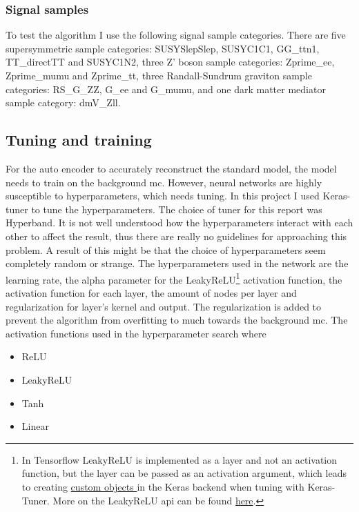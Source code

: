 \documentclass[ reprint, amsmath,amssymb, aps, nofootinbib]{revtex4-2}
\begin{document}
\subsubsection{Signal samples}
To test the algorithm I use the following signal sample categories. There are five supersymmetric sample categories: SUSYSlepSlep, SUSYC1C1, GG\_ttn1, TT\_directTT and SUSYC1N2\cite{DeSanto:2644352}, three Z' boson sample categories: Zprime\_ee, Zprime\_mumu and Zprime\_tt\cite{https://doi.org/10.48550/arxiv.1308.5874}, three Randall-Sundrum graviton sample categories: RS\_G\_ZZ, G\_ee and G\_mumu\cite{Randall_1999}, and one dark matter mediator sample category: dmV\_Zll. 

 

\subsection{Tuning and training}
For the auto encoder to accurately reconstruct the standard model, the model needs to train on the background mc. However, neural networks are highly susceptible to hyperparameters, which needs tuning. In this project I used Keras-tuner\cite{omalley2019kerastuner} to tune the hyperparameters. The choice of tuner for this report was Hyperband\cite{JMLR:v18:16-558}. It is not well understood how the hyperparameters interact with each other to affect the result, thus there are really no guidelines for approaching this problem. A result of this might be that the choice of hyperparameters seem completely random or strange. The hyperparameters used in the network are the learning rate, the alpha parameter for the LeakyReLU\footnote{In Tensorflow LeakyReLU is implemented as a layer and not an activation function, but the layer can be passed as an activation argument, which leads to creating \href{https://www.tensorflow.org/api_docs/python/tf/keras/utils/get_custom_objects}{custom objects } in the Keras backend when tuning with Keras-Tuner. More on the LeakyReLU api can be found \href{https://www.tensorflow.org/api_docs/python/tf/keras/layers/LeakyReLU}{here}.} activation function, the activation function for each layer, the amount of nodes per layer and regularization for layer's kernel and output. The regularization is added to prevent the algorithm from overfitting to much towards the background mc. The activation functions used in the hyperparameter search where
\begin{itemize}
    \item ReLU
    \item LeakyReLU
    \item Tanh
    \item Linear
\end{itemize}
\end{document}
